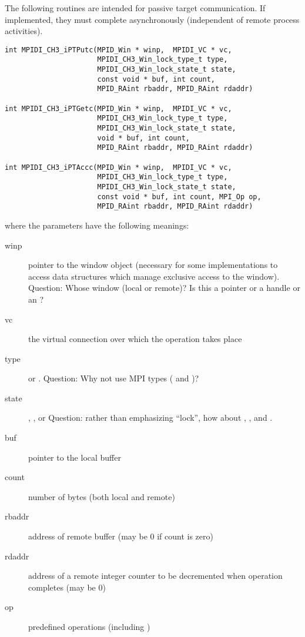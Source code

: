 \documentclass{article}
\begin{document}
The following routines are intended for passive target communication.  If
implemented, they must complete asynchronously (independent of remote process
activities).

\begin{verbatim}
int MPIDI_CH3_iPTPutc(MPID_Win * winp,  MPIDI_VC * vc,
                      MPIDI_CH3_Win_lock_type_t type,
                      MPIDI_CH3_Win_lock_state_t state,
                      const void * buf, int count,
                      MPID_RAint rbaddr, MPID_RAint rdaddr)

int MPIDI_CH3_iPTGetc(MPID_Win * winp,  MPIDI_VC * vc,
                      MPIDI_CH3_Win_lock_type_t type,
                      MPIDI_CH3_Win_lock_state_t state,
                      void * buf, int count,
                      MPID_RAint rbaddr, MPID_RAint rdaddr)

int MPIDI_CH3_iPTAccc(MPID_Win * winp,  MPIDI_VC * vc,
                      MPIDI_CH3_Win_lock_type_t type,
                      MPIDI_CH3_Win_lock_state_t state,
                      const void * buf, int count, MPI_Op op,
                      MPID_RAint rbaddr, MPID_RAint rdaddr)
\end{verbatim}
where the parameters have the following meanings:
\begin{description}
\item[winp]pointer to the window object (necessary for some implementations to
access data structures which manage exclusive access to the window).
Question: Whose window (local or remote)?  Is this a pointer or a handle or an
? 

\item[vc]the virtual connection over which the operation takes place

\item[type] or
  .
Question: Why not use MPI types ( and
)? 

\item[state],
  , or 
Question: rather than emphasizing ``lock'', how about
, , and
.

\item[buf]pointer to the local buffer

\item[count]number of bytes (both local and remote)

\item[rbaddr]address of remote buffer (may be 0 if count is zero)

\item[rdaddr]address of a remote integer counter to be decremented when
operation completes (may be 0)

\item[op]predefined  operations (including )
\end{description}
\end{document}
